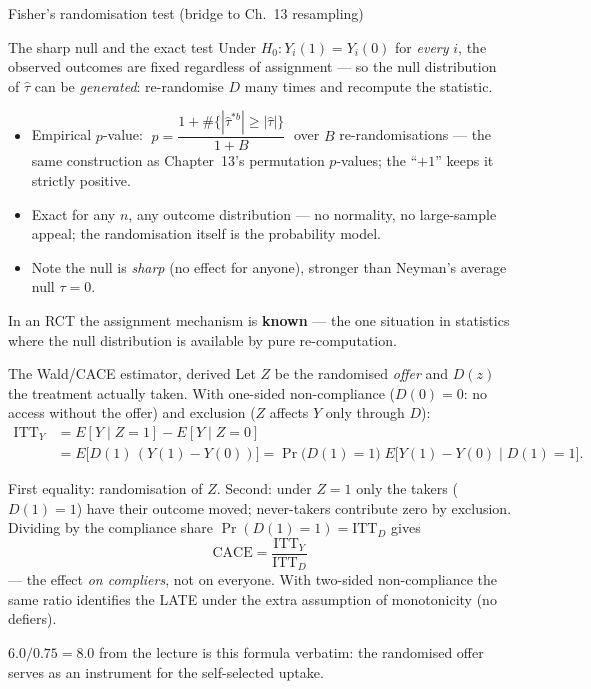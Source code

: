 \documentclass[aspectratio=169,11pt]{beamer}
\begin{document}
\begin{frame}{Fisher's randomisation test (bridge to Ch.\ 13 resampling)}
  \begin{block}{The sharp null and the exact test}
    Under $H_0\!: Y_i(1) = Y_i(0)$ for \emph{every} $i$, the observed outcomes are fixed
    regardless of assignment --- so the null distribution of $\hat\tau$ can be
    \emph{generated}: re-randomise $D$ many times and recompute the statistic.
  \end{block}
  \begin{readme}
    \begin{itemize}
      \item Empirical $p$-value:
            $\;p = \dfrac{1 + \#\{|\hat\tau^{*b}| \ge |\hat\tau|\}}{1 + B}\;$ over $B$
            re-randomisations --- the same construction as Chapter~13's permutation
            $p$-values; the ``$+1$'' keeps it strictly positive.
      \item Exact for any $n$, any outcome distribution --- no normality, no large-sample
            appeal; the randomisation itself is the probability model.
      \item Note the null is \emph{sharp} (no effect for anyone), stronger than
            Neyman's average null $\tau = 0$.
    \end{itemize}
  \end{readme}
  \begin{takeaway}
    In an RCT the assignment mechanism is \textbf{known} --- the one situation in
    statistics where the null distribution is available by pure re-computation.
  \end{takeaway}
\end{frame}

\begin{frame}{The Wald/CACE estimator, derived}
  Let $Z$ be the randomised \emph{offer} and $D(z)$ the treatment actually taken. With
  one-sided non-compliance ($D(0)=0$: no access without the offer) and exclusion
  ($Z$ affects $Y$ only through $D$):
  \begin{align*}
    \mathrm{ITT}_Y &= E[Y\mid Z{=}1] - E[Y\mid Z{=}0] \\
      &= E\big[D(1)\,(Y(1)-Y(0))\big]
       = \Pr\big(D(1)=1\big)\; E\big[Y(1)-Y(0)\mid D(1)=1\big] .
  \end{align*}
  \begin{readme}
    First equality: randomisation of $Z$. Second: under $Z=1$ only the takers
    ($D(1)=1$) have their outcome moved; never-takers contribute zero by exclusion.
    Dividing by the compliance share $\Pr(D(1)=1) = \mathrm{ITT}_D$ gives
    \[
      \boxed{\;\mathrm{CACE} = \frac{\mathrm{ITT}_Y}{\mathrm{ITT}_D}\;}
    \]
    --- the effect \emph{on compliers}, not on everyone. With two-sided non-compliance
    the same ratio identifies the LATE under the extra assumption of monotonicity
    (no defiers).
  \end{readme}
  \begin{takeaway}
    $6.0 / 0.75 = 8.0$ from the lecture is this formula verbatim: the randomised offer
    serves as an instrument for the self-selected uptake.
  \end{takeaway}
\end{frame}
\end{document}
